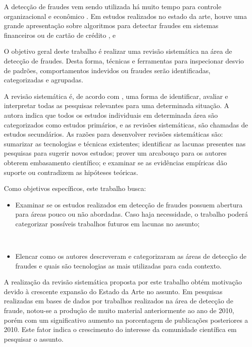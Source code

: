 \documentclass[smallextended]{svjour3}
\begin{document}
A detecção de fraudes vem sendo utilizada há muito tempo para controle organizacional e econômico \citep{Seyedhossein2010}. Em estudos realizados no estado da arte, houve uma grande apresentação sobre algoritmos para detectar fraudes em sistemas financeiros ou de cartão de crédito \citep{809570}, \citep{Chandola:2009:ADS:1541880.1541882} e \citep{Abdallah2016}

O objetivo geral deste trabalho é realizar uma revisão sistemática na área de detecção de fraudes. Desta forma, técnicas e ferramentas para inspecionar desvio de padrões, comportamentos indevidos ou fraudes serão identificadas, categorizadas e agrupadas.

A revisão sistemática é, de acordo com \cite{Kitchenham2004}, uma forma de identificar, avaliar e interpretar todas as pesquisas relevantes para uma determinada situação. A autora indica que todos os estudos individuais em determinada área são categorizados como estudos primários, e as revisões sistemáticas, são chamadas de estudos secundários. As razões para desenvolver revisões sistemáticas são: sumarizar as tecnologias e técnicas existentes; identificar as lacunas presentes nas pesquisas para sugerir novos estudos; prover um arcabouço para os autores obterem embasamento científico; e examinar se as evidências empíricas dão suporte ou contradizem as hipóteses teóricas. 

Como objetivos específicos, este trabalho busca:

\begin{itemize}
	\item Examinar se os estudos realizados em detecção de fraudes possuem abertura para áreas pouco ou não abordadas. Caso haja necessidade, o trabalho poderá categorizar possíveis trabalhos futuros em lacunas no assunto;
	
	\
	
	\item Elencar como os autores descreveram e categorizaram as áreas de detecção de fraudes e quais são tecnologias as mais utilizadas para cada contexto.
\end{itemize}

A realização da revisão sistemática proposta por este trabalho obtém motivação devido à crescente expansão do Estado da Arte no assunto. Em pesquisas realizadas em bases de dados por trabalhos realizados na área de detecção de fraude, notou-se a produção de muito material anteriormente ao ano de 2010, porém com um significativo aumento na porcentagem de publicações posteriores a 2010. Este fator indica o crescimento do interesse da comunidade científica em pesquisar o assunto.
\end{document}

